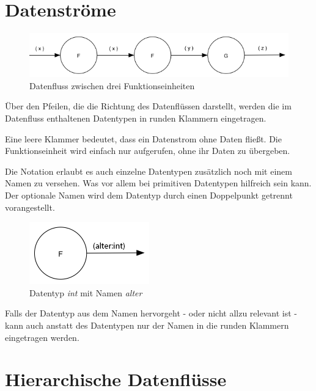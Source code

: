 \section{Datenströme}

 
\begin{figure}[!htbp]
	\includegraphics[width=1\linewidth]{./img/diagram1.png}
	\caption{Datenfluss zwischen drei Funktionseinheiten}
\end{figure}






Über den Pfeilen, die die Richtung des Datenflüssen darstellt, werden die im
Datenfluss enthaltenen Datentypen in runden Klammern eingetragen.

Eine leere Klammer bedeutet, dass ein Datenstrom ohne Daten fließt.
Die Funktionseinheit wird einfach nur aufgerufen, ohne ihr Daten zu übergeben.


Die Notation erlaubt es auch einzelne Datentypen zusätzlich noch mit einem Namen
zu versehen. Was vor allem bei primitiven Datentypen hilfreich sein kann. 
Der optionale Namen wird dem Datentyp durch einen Doppelpunkt getrennt vorangestellt.

\begin{figure}[!htbp]
	\centering
	\includegraphics[width=.4\linewidth]{./img/diagramNamedType.png}
	\caption{Datentyp \textit{int} mit Namen \textit{alter}}
\end{figure}


Falls der Datentyp aus dem Namen hervorgeht - oder nicht allzu relevant ist - kann auch anstatt des Datentypen nur der Namen in die runden Klammern eingetragen werden.


\clearpage

\section{Hierarchische Datenflüsse}



